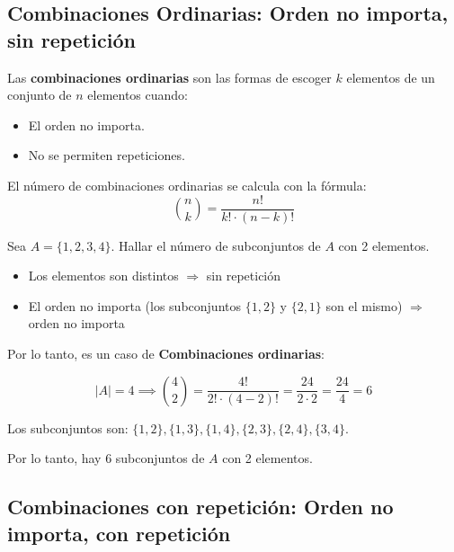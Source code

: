 \documentclass[a4paper,12pt]{article}
\begin{document}
\subsection{Combinaciones Ordinarias: Orden no importa, sin repetición}

\begin{procedimiento}[title=Definición de combinaciones ordinarias]
Las \textbf{combinaciones ordinarias} son las formas de escoger $k$ elementos de un conjunto de $n$ elementos cuando:
\begin{itemize}
    \item El orden no importa.
    \item No se permiten repeticiones.
\end{itemize}

El número de combinaciones ordinarias se calcula con la fórmula:
\[
\binom{n}{k} = \frac{n!}{k! \cdot (n-k)!}
\]
\end{procedimiento}

\begin{ejemplo}[title=Ejemplo: Subconjuntos de 2 elementos]
Sea $A = \{1, 2, 3, 4\}$. Hallar el número de subconjuntos de $A$ con 2 elementos.

\begin{itemize}
    \item Los elementos son distintos $\Rightarrow$ sin repetición
    \item El orden no importa (los subconjuntos $\{1, 2\}$ y $\{2, 1\}$ son el mismo) $\Rightarrow$ orden no importa
\end{itemize}

Por lo tanto, es un caso de \textbf{Combinaciones ordinarias}:

\[
|A| = 4 \implies \binom{4}{2} = \frac{4!}{2! \cdot (4-2)!} = \frac{24}{2 \cdot 2} = \frac{24}{4} = 6
\]

Los subconjuntos son: $\{1, 2\}, \{1, 3\}, \{1, 4\}, \{2, 3\}, \{2, 4\}, \{3, 4\}$.

Por lo tanto, hay 6 subconjuntos de $A$ con 2 elementos.
\end{ejemplo}

\subsection{Combinaciones con repetición: Orden no importa, con repetición}
\end{document}
